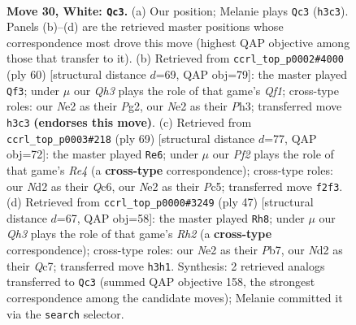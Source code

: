 \documentclass[11pt]{article}
\begin{document}
\clearpage

\begin{figure}[p]\centering
\begin{subfigure}{0.46\textwidth}\centering
\resizebox{\linewidth}{!}{%
\newchessgame
\chessboard[
  setfen={r2k4/b3n3/4p3/pp2q3/b1p3P1/P6Q/1P1NNP2/R1B1K3 w - - 1 30},
  showmover=false,
  pgfstyle=straightmove, color=movearrow, markmove={h3-c3}
]}
\caption{}
\end{subfigure}\hfill
\begin{subfigure}{0.46\textwidth}\centering
\resizebox{\linewidth}{!}{%
\newchessgame
\chessboard[
  setfen={3r3k/6p1/2Rpb2p/4p1b1/P3P3/2N3qP/2P1B1P1/5Q1K w - - 5 31},
  showmover=false,
  pgfstyle=straightmove, color=movearrow, markmove={f1-f3}
]}
\caption{}
\end{subfigure}
\\[4pt]
\begin{subfigure}{0.46\textwidth}\centering
\resizebox{\linewidth}{!}{%
\newchessgame
\chessboard[
  setfen={5bk1/p4p2/2q4p/2p1r3/P1Q1n1P1/8/5PP1/2BR1NK1 b - - 1 35},
  showmover=false,
  pgfstyle=straightmove, color=movearrow, markmove={e5-e6}
]}
\caption{}
\end{subfigure}\hfill
\begin{subfigure}{0.46\textwidth}\centering
\resizebox{\linewidth}{!}{%
\newchessgame
\chessboard[
  setfen={2k5/Qpq2p1r/2b1p3/4Pn2/5P2/P1pB4/2P5/R3K1B1 b Q - 1 24},
  showmover=false,
  pgfstyle=straightmove, color=movearrow, markmove={h7-h8}
]}
\caption{}
\end{subfigure}
\caption{\textbf{Move 30, White: \texttt{Qc3}.} (a) Our position; Melanie plays \texttt{Qc3} (\texttt{h3c3}). Panels (b)--(d) are the retrieved master positions whose correspondence most drove this move (highest QAP objective among those that transfer to it). (b) Retrieved from \texttt{ccrl\_top\_p0002\#4000} (ply 60) [structural distance $d$=69, QAP obj=79]: the master played \texttt{Qf3}; under $\mu$ our \emph{Qh3} plays the role of that game's \emph{Qf1}; cross-type roles: our \emph{N}e2 as their \emph{P}g2, our \emph{N}e2 as their \emph{P}h3; transferred move \texttt{h3c3} \textbf{(endorses this move)}. (c) Retrieved from \texttt{ccrl\_top\_p0003\#218} (ply 69) [structural distance $d$=77, QAP obj=72]: the master played \texttt{Re6}; under $\mu$ our \emph{Pf2} plays the role of that game's \emph{Re4} (a \textbf{cross-type} correspondence); cross-type roles: our \emph{N}d2 as their \emph{Q}c6, our \emph{N}e2 as their \emph{P}c5; transferred move \texttt{f2f3}. (d) Retrieved from \texttt{ccrl\_top\_p0000\#3249} (ply 47) [structural distance $d$=67, QAP obj=58]: the master played \texttt{Rh8}; under $\mu$ our \emph{Qh3} plays the role of that game's \emph{Rh2} (a \textbf{cross-type} correspondence); cross-type roles: our \emph{N}e2 as their \emph{P}b7, our \emph{N}d2 as their \emph{Q}c7; transferred move \texttt{h3h1}. Synthesis: 2 retrieved analogs transferred to \texttt{Qc3} (summed QAP objective 158, the strongest correspondence among the candidate moves); Melanie committed it via the \texttt{search} selector.}
\label{fig:thought-m58}
\end{figure}
\end{document}
